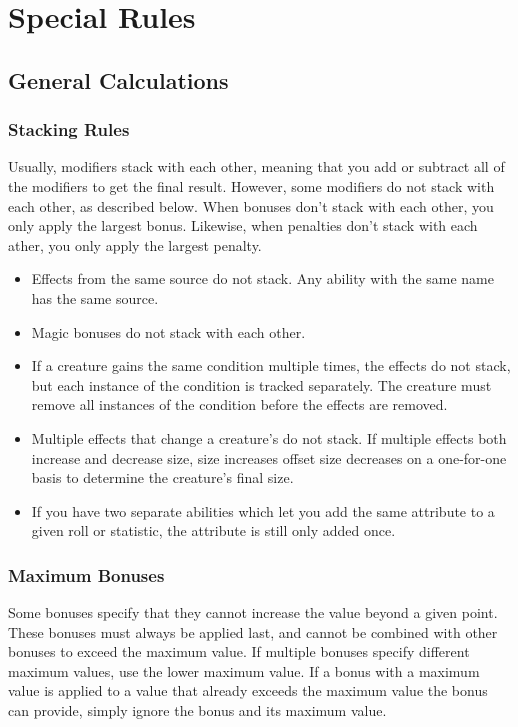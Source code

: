 \section{Special Rules}

    \subsection{General Calculations}

        \subsubsection{Stacking Rules}\label{Stacking Rules}
            Usually, modifiers stack with each other, meaning that you add or subtract all of the modifiers to get the final result.
            However, some modifiers do not stack with each other, as described below.
            When bonuses don't stack with each other, you only apply the largest bonus.
            Likewise, when penalties don't stack with each ather, you only apply the largest penalty.


            \begin{itemize}
                \item Effects from the same source do not stack. Any ability with the same name has the same source.
                \item Magic bonuses do not stack with each other.
                \item If a creature gains the same condition multiple times, the effects do not stack, but each instance of the condition is tracked separately.
                    The creature must remove all instances of the condition before the effects are removed.
                \item Multiple effects that change a creature's  do not stack.
                    If multiple effects both increase and decrease size, size increases offset size decreases on a one-for-one basis to determine the creature's final size.
                \item If you have two separate abilities which let you add the same attribute to a given roll or statistic, the attribute is still only added once.
            \end{itemize}

        \subsubsection{Maximum Bonuses}\label{Ability Limits}
            Some bonuses specify that they cannot increase the value beyond a given point.
            These bonuses must always be applied last, and cannot be combined with other bonuses to exceed the maximum value.
            If multiple bonuses specify different maximum values, use the lower maximum value.
            If a bonus with a maximum value is applied to a value that already exceeds the maximum value the bonus can provide, simply ignore the bonus and its maximum value.

